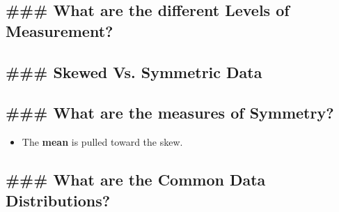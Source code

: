 \documentclass[11pt]{article}
\providecommand{\tightlist}{%
      \setlength{\itemsep}{0pt}\setlength{\parskip}{0pt}}
\begin{document}
    

    \subsection{\#\#\# What are the different Levels of
Measurement?}\label{what-are-the-different-levels-of-measurement}

    

    \subsection{\#\#\# Skewed Vs. Symmetric
Data}\label{skewed-vs.-symmetric-data}

    

    \subsection{\#\#\# What are the measures of
Symmetry?}\label{what-are-the-measures-of-symmetry}

    \begin{itemize}
\tightlist
\item
  The \textbf{mean} is pulled toward the skew.
\end{itemize}

    \subsection{\#\#\# What are the Common Data
Distributions?}\label{what-are-the-common-data-distributions}
\end{document}
